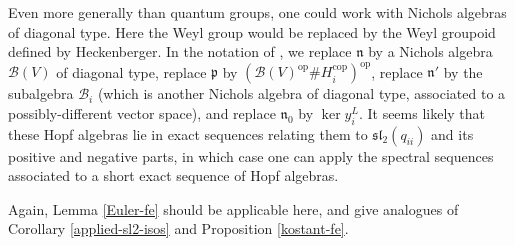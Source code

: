 \documentclass[11pt,letterpaper]{article}
\theoremstyle{definition}
\theoremstyle{remark}
\numberwithin{equation}{section}
\theoremstyle{dotless}
\newcommand{\qv}{v}
\newcommand{\Ext}{\operatorname{Ext}}
\begin{document}

Even more generally than quantum groups, one could work with Nichols algebras of diagonal type. Here the Weyl group would be replaced by the Weyl groupoid defined by Heckenberger. In the notation of \cite[p. 180]{HeckenbergerWeyl}, we replace $\mathfrak n$ by a Nichols algebra $\mathcal B(V)$ of diagonal type, replace $\mathfrak p$ by $ (\mathcal B(V)^{\mathrm{op}} \# H_i^{ \mathrm{cop}} )^{\mathrm{op}}$, replace $\mathfrak n'$ by the subalgebra $\mathcal B_i $ (which is another Nichols algebra of diagonal type, associated to a possibly-different vector space), and replace $\mathfrak n_0$ by $\operatorname{ker} y_i^L$. %
It seems likely that these Hopf algebras lie in exact sequences relating them to $\mathfrak{sl}_2(q_{ii})$ and its positive and negative parts, in which case one can apply the spectral sequences associated to a short exact sequence of Hopf algebras.

Again, Lemma \ref{Euler-fe} should be applicable here, and give analogues of Corollary \ref{applied-sl2-isos} and Proposition \ref{kostant-fe}. %


\printbibliography
\end{document}
